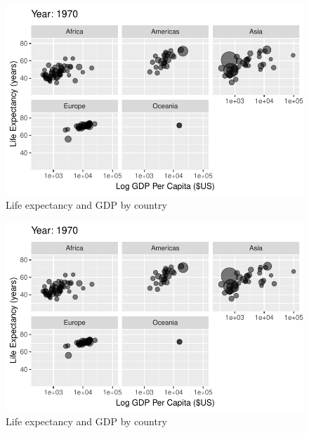 \documentclass[
  letterpaper,
  DIV=11,
  numbers=noendperiod]{scrreport}
\theoremstyle{definition}
\theoremstyle{remark}
\begin{document}
\begin{figure}

{\centering \includegraphics{index_files/figure-pdf/fig-anim-lifegdp-33.pdf}

}

\caption{\label{fig-anim-lifegdp-33}Life expectancy and GDP by country}

\end{figure}

\begin{figure}

{\centering \includegraphics{index_files/figure-pdf/fig-anim-lifegdp-34.pdf}

}

\caption{\label{fig-anim-lifegdp-34}Life expectancy and GDP by country}

\end{figure}
\end{document}
